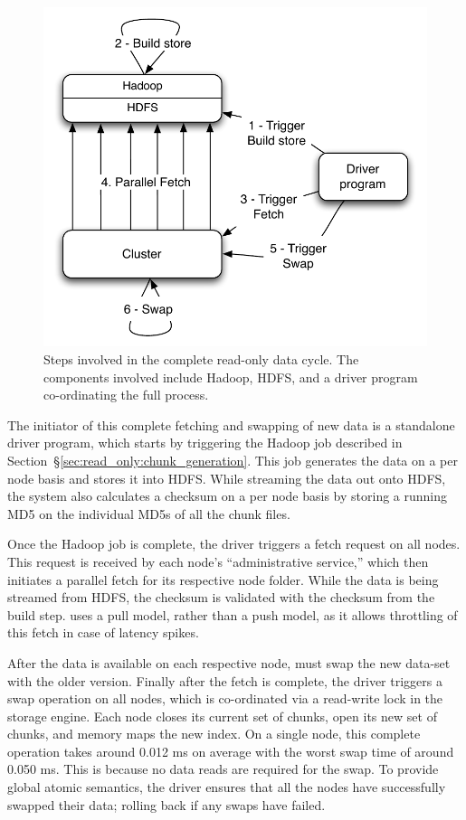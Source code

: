 \begin{figure}
  \centering
    \includegraphics[scale=0.60]{images/cycle.pdf}
  \caption{Steps involved in the complete read-only data cycle. The components involved include Hadoop, HDFS, \projectname{} and a driver program co-ordinating the full process.}
  \label{cycle}
\end{figure}

The initiator of this complete fetching and swapping of new data is a
standalone driver program, which starts by triggering the Hadoop job
described in Section~\S\ref{sec:read_only:chunk_generation}. This job
generates the data on a per node basis and stores it into HDFS. While
streaming the data out onto HDFS, the system also calculates a
checksum on a per node basis by storing a running MD5 on the
individual MD5s of all the chunk files. 

Once the Hadoop job is complete, the driver triggers a fetch request
on all \projectname{} nodes. This request is received by each node's
``administrative service,'' which then initiates a parallel fetch for
its respective node folder. While the data is being streamed from
HDFS, the checksum is validated with the checksum from the build step.
\projectname{} uses a pull model, rather than a push model, as it allows
throttling of this fetch in case of latency spikes.

After the data is available on each respective node, \projectname{} must swap
the new data-set with the older version. Finally after the fetch is
complete, the driver triggers a swap operation on all nodes, which is
co-ordinated via a read-write lock in the storage engine. Each node
closes its current set of chunks, open its new set of chunks, and
memory maps the new index. On a single node, this complete 
operation takes around 0.012 ms on average with the worst swap time of 
around 0.050 ms. This is because no data reads are required for the 
swap. To provide global atomic semantics, the driver ensures that 
all the nodes have successfully swapped their data; rolling back if 
any swaps have failed.

